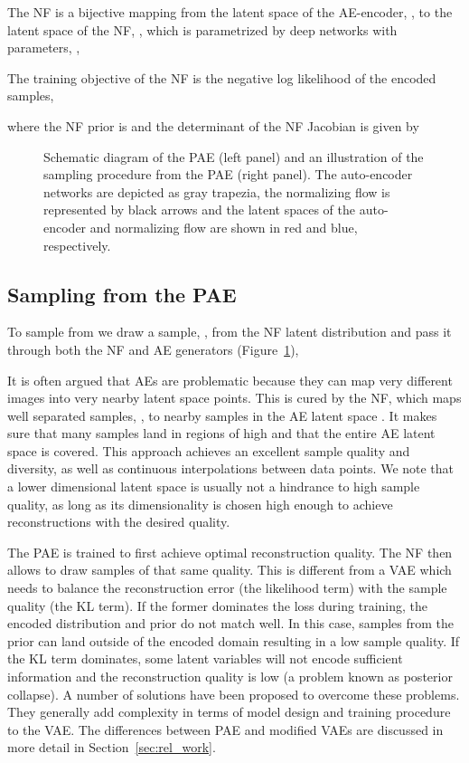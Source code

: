 \documentclass{article}
\begin{document}
The NF is a bijective mapping from the latent space of the AE-encoder, , to the latent space of the NF, , which is parametrized by deep networks with parameters, ,

The training objective of the NF is the negative log likelihood of the encoded samples,

where the NF prior is  and the determinant of the NF Jacobian is given by

\begin{figure}
\caption{\label{fig:illu} Schematic diagram of the PAE (left panel) and an illustration of the sampling procedure from the PAE (right panel). The auto-encoder networks are depicted as gray trapezia, the normalizing flow is represented by black arrows and the latent spaces of the auto-encoder and normalizing flow are shown in red and blue, respectively.}
\end{figure}
\subsection{Sampling from the PAE}
\label{sec:sampling}
To sample from  we draw a sample, , from the NF latent distribution and pass it through both the NF and AE generators (Figure~\ref{fig:illu}), 



It is often argued that AEs are problematic because they can map 
very different images into very nearby latent space points. 
This is cured by the NF, which maps well separated samples, , to nearby samples in the AE latent space . It makes sure that many samples land in regions of high  and that the entire AE latent space is covered. This approach achieves an excellent sample quality and diversity, as well as continuous interpolations between data points. 
We note that a lower dimensional latent space is usually not a hindrance to high sample quality, as long as its dimensionality is chosen high enough to achieve reconstructions with the desired quality. 


The PAE is trained to first achieve optimal reconstruction quality. The NF then allows to draw samples of that same quality. This is different from a VAE which needs to balance the reconstruction error (the likelihood term) with the sample quality (the KL term). If the former dominates the loss during training, the encoded distribution and prior do not match well. In this case, samples from the prior can land outside of the encoded domain resulting in a low sample quality. If the KL term dominates, some latent variables will not encode sufficient information and the reconstruction quality is low (a problem known as posterior collapse). A number of solutions have been proposed to overcome these problems. They generally add complexity in terms of model design and training procedure to the VAE. The differences between PAE and modified VAEs are discussed in more detail in Section~\ref{sec:rel_work}.
\end{document}
